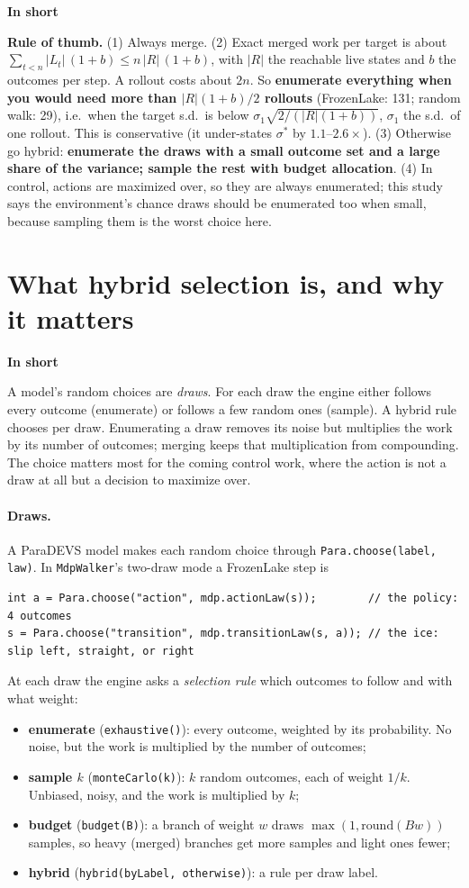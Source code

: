 \documentclass[11pt]{article}
\newcommand{\code}[1]{\texttt{#1}}
\newcommand{\shadedbox}[3]{\par\smallskip\noindent\colorbox{#1}{\parbox{\dimexpr\linewidth-2\fboxsep}{\textbf{#2}\par #3}}\par\smallskip}
\newcommand{\takeaway}[1]{\shadedbox{okbg}{In short}{#1}}
\begin{document}
{\takeaway{\textbf{Rule of thumb.} (1) Always merge. (2) Exact merged work per target is about
$\sum_{t<n}|L_t|\,(1+b)\le n\,|R|\,(1+b)$, with $|R|$ the reachable live states and $b$ the outcomes per step. A rollout
costs about $2n$. So \textbf{enumerate everything when you would need more than $|R|(1+b)/2$ rollouts}
(FrozenLake: 131; random walk: 29), i.e.\ when the target s.d.\ is below
$\sigma_1\sqrt{2/(|R|(1+b))}$, $\sigma_1$ the s.d.\ of one rollout. This is conservative (it under-states $\sigma^*$ by
$1.1$--$2.6\times$). (3) Otherwise go hybrid: \textbf{enumerate the draws with a small outcome set and a large share of
the variance; sample the rest with budget allocation}. (4) In control, actions are maximized over, so they are always
enumerated; this study says the environment's chance draws should be enumerated too when small, because sampling
them is the worst choice here.}
}

\newpage
\section{What hybrid selection is, and why it matters}\label{sec:what}

\takeaway{A model's random choices are \emph{draws}. For each draw the engine either follows every outcome
(enumerate) or follows a few random ones (sample). A hybrid rule chooses per draw. Enumerating a draw removes its noise
but multiplies the work by its number of outcomes; merging keeps that multiplication from compounding. The choice
matters most for the coming control work, where the action is not a draw at all but a decision to maximize over.}

\paragraph{Draws.} A ParaDEVS model makes each random choice through \code{Para.choose(label, law)}. In
\code{MdpWalker}'s two-draw mode a FrozenLake step is
\begin{lstlisting}
int a = Para.choose("action", mdp.actionLaw(s));        // the policy: 4 outcomes
s = Para.choose("transition", mdp.transitionLaw(s, a)); // the ice: slip left, straight, or right
\end{lstlisting}
At each draw the engine asks a \emph{selection rule} which outcomes to follow and with what weight:
\begin{itemize}
\item \textbf{enumerate} (\code{exhaustive()}): every outcome, weighted by its probability. No noise, but the work is
  multiplied by the number of outcomes;
\item \textbf{sample $k$} (\code{monteCarlo(k)}): $k$ random outcomes, each of weight $1/k$. Unbiased, noisy, and the work is
  multiplied by $k$;
\item \textbf{budget} (\code{budget(B)}): a branch of weight $w$ draws $\max(1,\mathrm{round}(Bw))$ samples, so heavy
  (merged) branches get more samples and light ones fewer;
\item \textbf{hybrid} (\code{hybrid(byLabel, otherwise)}): a rule per draw label.
\end{itemize}
\end{document}
